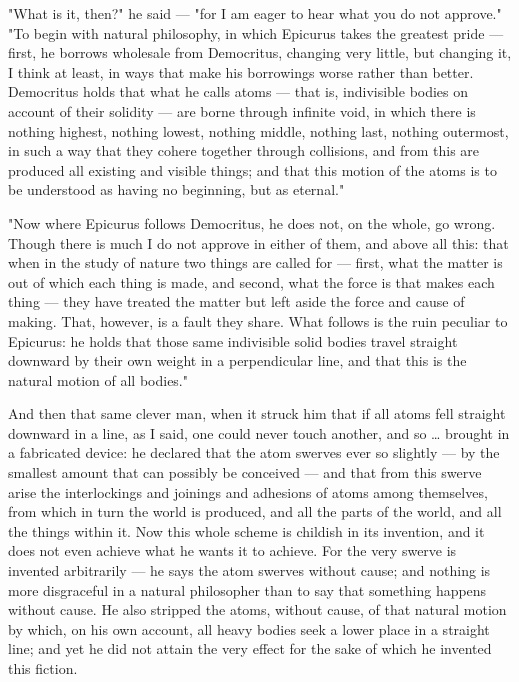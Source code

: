  "What is it, then?" he said — "for I am eager to hear what you do not approve." "To begin with natural philosophy, in which Epicurus takes the greatest pride — first, he borrows wholesale from Democritus, changing very little, but changing it, I think at least, in ways that make his borrowings worse rather than better. Democritus holds that what he calls atoms — that is, indivisible bodies on account of their solidity — are borne through infinite void, in which there is nothing highest, nothing lowest, nothing middle, nothing last, nothing outermost, in such a way that they cohere together through collisions, and from this are produced all existing and visible things; and that this motion of the atoms is to be understood as having no beginning, but as eternal."

 "Now where Epicurus follows Democritus, he does not, on the whole, go wrong. Though there is much I do not approve in either of them, and above all this: that when in the study of nature two things are called for — first, what the matter is out of which each thing is made, and second, what the force is that makes each thing — they have treated the matter but left aside the force and cause of making. That, however, is a fault they share. What follows is the ruin peculiar to Epicurus: he holds that those same indivisible solid bodies travel straight downward by their own weight in a perpendicular line, and that this is the natural motion of all bodies."


 And then that same clever man, when it struck him that if all atoms fell straight downward in a line, as I said, one could never touch another, and so … brought in a fabricated device: he declared that the atom swerves ever so slightly — by the smallest amount that can possibly be conceived — and that from this swerve arise the interlockings and joinings and adhesions of atoms among themselves, from which in turn the world is produced, and all the parts of the world, and all the things within it. Now this whole scheme is childish in its invention, and it does not even achieve what he wants it to achieve. For the very swerve is invented arbitrarily — he says the atom swerves without cause; and nothing is more disgraceful in a natural philosopher than to say that something happens without cause. He also stripped the atoms, without cause, of that natural motion by which, on his own account, all heavy bodies seek a lower place in a straight line; and yet he did not attain the very effect for the sake of which he invented this fiction.

